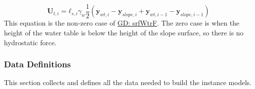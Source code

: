 \documentclass[12pt]{article}
\begin{document}
\begin{displaymath}
{\mathbf{U}_{t,i}}={\mathbf{ℓ}_{s,i}} {γ_{w}} \frac{1}{2} \left({\mathbf{y}_{wt,i}}-{\mathbf{y}_{slope,i}}+{\mathbf{y}_{wt,i-1}}-{\mathbf{y}_{slope,i-1}}\right)
\end{displaymath}
This equation is the non-zero case of \hyperref[GD:srfWtrF]{GD: srfWtrF}. The zero case is when the height of the water table is below the height of the slope surface, so there is no hydrostatic force.

\subsubsection{Data Definitions}
\label{Sec:DDs}
This section collects and defines all the data needed to build the instance models.

\vspace{\baselineskip}
\noindent
\end{document}
